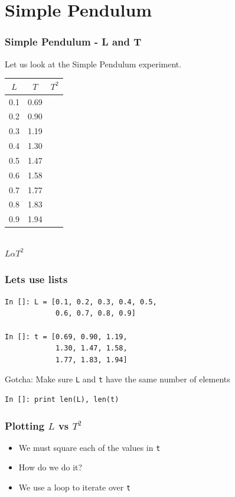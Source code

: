 \documentclass[14pt,compress]{beamer}
\newcommand{\typ}[1]{\lstinline{#1}}
\newcommand{\kwrd}[1]{ \texttt{\textbf{\color{blue}{#1}}}  }
\begin{document}
\section{Simple Pendulum}
\begin{frame}[fragile]
\frametitle{Simple Pendulum - L and T}
Let us look at the Simple Pendulum experiment.
\begin{center}
\begin{small}
\begin{tabular}{| c | c | c |}
\hline
$L$ & $T$ & $T^2$ \\ \hline
0.1 & 0.69 & \\ \hline
0.2 & 0.90 & \\ \hline
0.3 & 1.19 & \\ \hline
0.4 & 1.30 & \\ \hline
0.5 & 1.47 & \\ \hline
0.6 & 1.58 & \\ \hline
0.7 & 1.77 & \\ \hline
0.8 & 1.83 & \\ \hline
0.9 & 1.94 & \\ \hline
\end{tabular}
\end{small}\\
\alert{$L \alpha T^2$}
\end{center}
\end{frame}

\begin{frame}[fragile]
\frametitle{Lets use lists}
\begin{lstlisting}
In []: L = [0.1, 0.2, 0.3, 0.4, 0.5, 
            0.6, 0.7, 0.8, 0.9]

In []: t = [0.69, 0.90, 1.19, 
            1.30, 1.47, 1.58, 
            1.77, 1.83, 1.94]
\end{lstlisting}
\alert{Gotcha}: Make sure \typ{L} and \typ{t} have the same number
of elements

\begin{lstlisting}
In []: print len(L), len(t)
\end{lstlisting}

\end{frame}

\begin{frame}[fragile]
\frametitle{Plotting $L$ vs $T^2$}
\begin{itemize}
\item We must square each of the values in \typ{t}
\item How do we do it?
\item We use a \kwrd{for} loop to iterate over \typ{t}
\end{itemize}
\end{frame}
\end{document}
